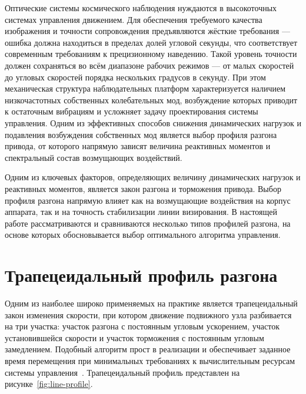 Оптические системы космического наблюдения нуждаются в высокоточных системах управления движением. Для обеспечения требуемого качества изображения и точности сопровождения предъявляются жёсткие требования — ошибка должна находиться в пределах долей угловой секунды, что соответствует современным требованиям к прецизионному наведению. Такой уровень точности должен сохраняться во всём диапазоне рабочих режимов — от малых скоростей до угловых скоростей порядка нескольких градусов в секунду. При этом механическая структура наблюдательных платформ характеризуется наличием низкочастотных собственных колебательных мод, возбуждение которых приводит к остаточным вибрациям и усложняет задачу проектирования системы управления. Одним из эффективных способов снижения динамических нагрузок и подавления возбуждения собственных мод является выбор профиля разгона привода, от которого напрямую зависят величина реактивных моментов и спектральный состав возмущающих воздействий.

Одним из ключевых факторов, определяющих величину динамических нагрузок и реактивных моментов, является закон разгона и торможения привода. Выбор профиля разгона напрямую влияет как на возмущающие воздействия на корпус аппарата, так и на точность стабилизации линии визирования. В настоящей работе рассматриваются и сравниваются несколько типов профилей разгона, на основе которых обосновывается выбор оптимального алгоритма управления.




\section{Трапецеидальный профиль разгона}
Одним из наиболее широко применяемых на практике является трапецеидальный закон изменения скорости, при котором движение подвижного узла разбивается на три участка: участок разгона с постоянным угловым ускорением, участок установившейся скорости и участок торможения с постоянным угловым замедлением. Подобный алгоритм прост в реализации и обеспечивает заданное время перемещения при минимальных требованиях к вычислительным ресурсам системы управления~\cite{Zhang2012, Austin2005}. Трапецеидальный профиль представлен на рисунке~\cref{fig:line-profile}. 

